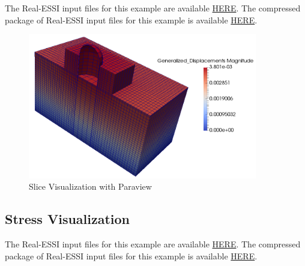 The Real-ESSI input files for this example are available 
\href{https://github.com/yuan-energy/Real-ESSI-Short-Course-Examples/tree/master/short-course-examples/Day1/Nuclear_Power_Plant_with_1D_motions_from_Deconvolution}{HERE}. 
The compressed package of Real-ESSI input files for this example is available 
\href{https://github.com/yuan-energy/Real-ESSI-Short-Course-Examples/blob/master/short-course-examples/Day1/Nuclear_Power_Plant_with_1D_motions_from_Deconvolution/Nuclear_Power_Plant_with_1D_motions_from_Deconvolution.tgz?raw=true}{HERE}.  

\begin{figure}[H]
  \centering
  \includegraphics[width = 10cm]{./Figure-files/Day1/Postprocess_examples_with_Paraview/slide_visualization.png}
  \caption{Slice Visualization with Paraview}
  \label{fig_paraview_slice}
\end{figure}


\clearpage
\newpage
\subsection{Stress Visualization}

The Real-ESSI input files for this example are available 
\href{https://github.com/yuan-energy/Real-ESSI-Short-Course-Examples/tree/master/short-course-examples/Day1/Nuclear_Power_Plant_with_1D_motions_from_Deconvolution}{HERE}. 
The compressed package of Real-ESSI input files for this example is available 
\href{https://github.com/yuan-energy/Real-ESSI-Short-Course-Examples/blob/master/short-course-examples/Day1/Nuclear_Power_Plant_with_1D_motions_from_Deconvolution/Nuclear_Power_Plant_with_1D_motions_from_Deconvolution.tgz?raw=true}{HERE}.  

